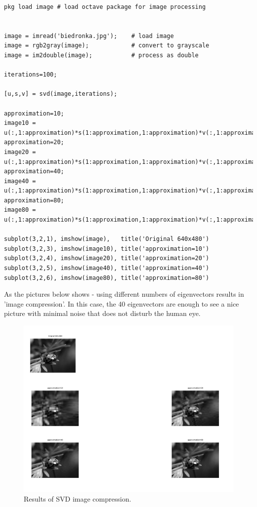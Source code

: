 \documentclass[eng,openany]{mgr}
\begin{document}
\begin{lstlisting}
pkg load image # load octave package for image processing


image = imread('biedronka.jpg');	# load image
image = rgb2gray(image);			# convert to grayscale
image = im2double(image);			# process as double

iterations=100;

[u,s,v] = svd(image,iterations);

approximation=10;
image10 = u(:,1:approximation)*s(1:approximation,1:approximation)*v(:,1:approximation)';
approximation=20;
image20 = u(:,1:approximation)*s(1:approximation,1:approximation)*v(:,1:approximation)';
approximation=40;
image40 = u(:,1:approximation)*s(1:approximation,1:approximation)*v(:,1:approximation)';
approximation=80;
image80 = u(:,1:approximation)*s(1:approximation,1:approximation)*v(:,1:approximation)';

subplot(3,2,1), imshow(image),   title('Original 640x480')
subplot(3,2,3), imshow(image10), title('approximation=10')
subplot(3,2,4), imshow(image20), title('approximation=20')
subplot(3,2,5), imshow(image40), title('approximation=40')
subplot(3,2,6), imshow(image80), title('approximation=80')
\end{lstlisting}
\newpage
As the pictures below shows - using different numbers of eigenvectors results in 'image compression'. In this case, the 40 eigenvectors are enough to see a nice picture with minimal noise that does not disturb the human eye.
\begin{figure}[h]
\centering
\includegraphics[width=1.1\linewidth]{screenshot018}
\caption{Results of SVD image compression.}
\label{fig:screenshot018}
\end{figure}
\end{document}
